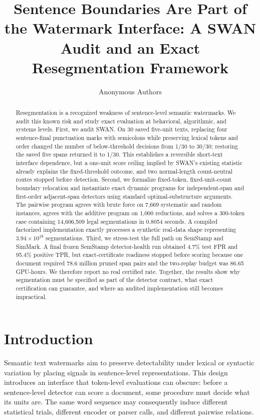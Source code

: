 \documentclass[10pt]{article}
\title{Sentence Boundaries Are Part of the Watermark Interface:
A SWAN Audit and an Exact Resegmentation Framework}
\author{\name Anonymous Authors}
\begin{document}
\maketitle

\begin{abstract}
Resegmentation is a recognized weakness of sentence-level semantic watermarks.
We audit this known risk and study exact evaluation at behavioral, algorithmic,
and systems levels. First, we audit SWAN. On 30 saved five-unit texts, replacing four sentence-final punctuation
marks with semicolons while preserving lexical tokens and order changed the
number of below-threshold decisions from 1/30 to 30/30; restoring the saved
five spans returned it to 1/30. This establishes a reversible short-text
interface dependence, but a one-unit score ceiling implied by SWAN's existing
statistic already explains the fixed-threshold outcome, and two normal-length count-neutral routes stopped
before detection. Second, we formalize fixed-token, fixed-unit-count boundary
relocation and instantiate exact dynamic programs for independent-span and
first-order adjacent-span detectors using standard optimal-substructure
arguments. The pairwise program agrees with brute
force on 7,669 systematic and random instances, agrees with the additive
program on 1,000 reductions, and solves a 300-token case containing
14,606,509 legal segmentations in 0.8054 seconds. A compiled factorized
implementation exactly processes a synthetic real-data shape representing
$3.94\times10^{19}$ segmentations. Third, we stress-test the full path on
SemStamp and SimMark. A final frozen SemStamp detector-health run obtained
4.7\% test FPR and 95.4\% positive TPR, but exact-certificate readiness
stopped before scoring because one document required 78.6 million pruned
span pairs and the two-replay budget was 86.65 GPU-hours. We therefore report
no real certified rate. Together, the results show why segmentation must be
specified as part of the detector contract, what exact certification can
guarantee, and where an audited implementation still becomes impractical.
\end{abstract}

\section{Introduction}

Semantic text watermarks aim to preserve detectability under lexical or
syntactic variation by placing signals in sentence-level representations.
This design introduces an interface that token-level evaluations can obscure:
before a sentence-level detector can score a document, some procedure must
decide what its units are. The same word sequence may consequently induce
different statistical trials, different encoder or parser calls, and
different pairwise relations.
\end{document}
